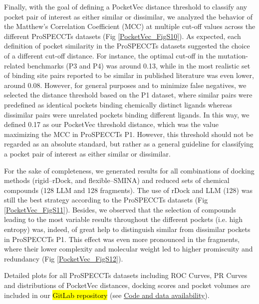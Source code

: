 Finally, with the goal of defining a PocketVec distance threshold to classify any pocket pair of interest as either similar or dissimilar, we analyzed the behavior of the Matthew's Correlation Coefficient (MCC) at multiple cut-off values across the different ProSPECCTs datasets (Fig \ref{PocketVec_FigS10}). As expected, each definition of pocket similarity in the ProSPECCTs datasets suggested the choice of a different cut-off distance. For instance, the optimal cut-off in the mutation-related benchmarks (P3 and P4) was around 0.13, while in the most realistic set of binding site pairs reported to be similar in published literature was even lower, around 0.08. However, for general purposes and to minimize false negatives, we selected the distance threshold based on the P1 dataset, where similar pairs were predefined as identical pockets binding chemically distinct ligands whereas dissimilar pairs were unrelated pockets binding different ligands. In this way, we defined 0.17 as our PocketVec threshold distance, which was the value maximizing the MCC in ProSPECCTs P1. However, this threshold should not be regarded as an absolute standard, but rather as a general guideline for classifying a pocket pair of interest as either similar or dissimilar.

For the sake of completeness, we generated results for all combinations of docking methods (rigid--rDock, and flexible--SMINA) and reduced sets of chemical compounds (128 LLM and 128 fragments). The use of rDock and LLM (128) was still the best strategy according to the ProSPECCTs datasets (Fig \ref{PocketVec_FigS11}). Besides, we observed that the selection of compounds leading to the most variable results throughout the different pockets (i.e. high entropy) was, indeed, of great help to distinguish similar from dissimilar pockets in ProSPECCTs P1. This effect was even more pronounced in the fragments, where their lower complexity and molecular weight led to higher promiscuity and redundancy (Fig \ref{PocketVec_FigS12}).

Detailed plots for all ProSPECCTs datasets including ROC Curves, PR Curves and distributions of PocketVec distances, docking scores and pocket volumes are included in our \hl{GitLab repository} (see \hyperref[PocketVec_Code]{Code and data availability}). 




